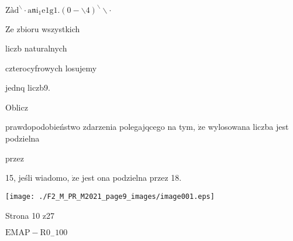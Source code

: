\documentclass[a4paper,12pt]{article}
\begin{document}
$\mathrm{Z}\text{à} \mathrm{d}^{\backslash }\cdot \mathrm{a}\mathfrak{n}\mathrm{i}_{1}\mathrm{e}1\mathrm{g}1. (0-\backslash 4)^{\backslash }\backslash \cdot$

Ze zbioru wszystkich

liczb naturalnych

czterocyfrowych losujemy

jednq liczb9.

Oblicz

prawdopodobieństwo zdarzenia polegajqcego na tym, $\dot{\mathrm{z}}\mathrm{e}$ wylosowana liczba jest podzielna

przez

15, jeśli wiadomo, $\dot{\mathrm{z}}\mathrm{e}$ jest ona podzielna przez 18.
\begin{center}
\texttt{[image: ./F2\_M\_PR\_M2021\_page9\_images/image001.eps]}
\end{center}
Strona 10 z27

$\mathrm{E}\mathrm{M}\mathrm{A}\mathrm{P}-\mathrm{R}0_{-}100$
\end{document}
